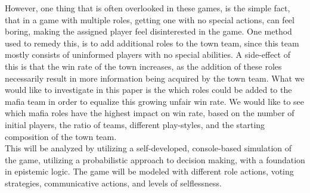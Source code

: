 However, one thing that is often overlooked in these games, is the simple fact, 
that in a game with multiple roles, getting one with no special actions, can 
feel boring, making the assigned player feel disinterested in the game. One 
method used to remedy this, is to add additional roles to the town team, since 
this team mostly consists of uninformed players with no special abilities. A 
side-effect of this is that the win rate of the town increases, as the addition 
of these roles necessarily result in more information being acquired by the 
town team. What we would like to investigate in this paper is the which roles 
could be added to the mafia team in order to equalize this growing unfair win 
rate. We would like to see which mafia roles have the highest impact on win 
rate, based on the number of initial players, the ratio of teams, different 
play-styles, and the starting composition of the town team. \\
This will be analyzed by utilizing a self-developed, console-based simulation 
of the game, utilizing a probabilistic approach to decision making, with a 
foundation in epistemic logic. The game will be modeled with different role 
actions, voting strategies, communicative actions, and levels of selflessness.